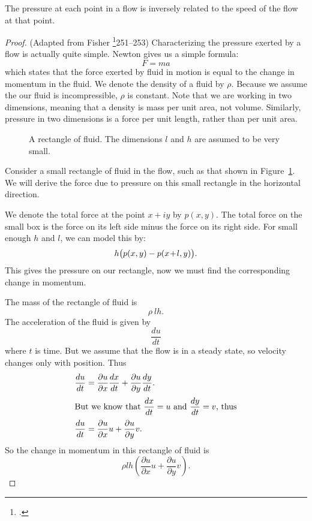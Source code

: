 \documentclass[letterpaper, twoside, 12 pt]{article}
\begin{document}
	\begin{theorem}
		The pressure at each point in a flow is inversely related to the speed of the flow at that point.
	\end{theorem}
	\begin{proof}
		(Adapted from Fisher \footcite{fisher}{251--253})
		Characterizing the pressure exerted by a flow is actually quite simple.
		Newton gives us a simple formula:
		\[
			F = ma
		\]
		which states that the force exerted by fluid in motion is equal to the change in momentum in the fluid.
		We denote the density of a fluid by $\rho$.
		Because we assume the our fluid is incompressible, $\rho$ is constant.
		Note that we are working in two dimensions, meaning that a density is mass per unit area, not volume.
		Similarly, pressure in two dimensions is a force per unit length, rather than per unit area.


		\begin{figure}[H]
			\centering
			\begin{tikzpicture}
				
			\end{tikzpicture}
			\captionsetup{width = 0.5 \textwidth}
			\caption{
				A rectangle of fluid.
				The dimensions $l$ and $h$ are assumed to be very small.
			}
			\label{fig:pressure_rectangle}
		\end{figure}

		Consider a small rectangle of fluid in the flow, such as that shown in Figure~\ref{fig:pressure_rectangle}.
		We will derive the force due to pressure on this small rectangle in the horizontal direction.
		
		We denote the total force at the point $x + iy$ by $p(x, y)$.
		The total force on the small box is the force on its left side minus the force on its right side.
		For small enough $h$ and $l$, we can model this by:
		\[
			h \big( p(x, y) - p(x \tp l, y) \big).
		\]
		This gives the pressure on our rectangle, now we must find the corresponding change in momentum.

		The mass of the rectangle of fluid is
		\[
			\rho \> lh.
		\]
		The acceleration of the fluid is given by 
		\[
			\frac{du}{dt}
		\]
		where $t$ is time.
		But we assume that the flow is in a steady state, so velocity changes only with position.
		Thus
		\begin{align*}
		\frac{du}{dt} &= \frac{\partial u}{\partial x} \frac{dx}{dt} + \frac{\partial u}{\partial y} \frac{dy}{dt}. \\
		\intertext{But we know that $\displaystyle\frac{dx}{dt} = u$ and $\displaystyle\frac{dy}{dt} = v$, thus}
		\frac{du}{dt} &= \frac{\partial u}{\partial x} u + \frac{\partial u}{\partial y} v.
		\end{align*}
		So the change in momentum in this rectangle of fluid is
		\[
			\rho lh \left( \frac{\partial u}{\partial x} u + \frac{\partial u}{\partial y} v \right).
		\]


\end{proof}
\end{document}
